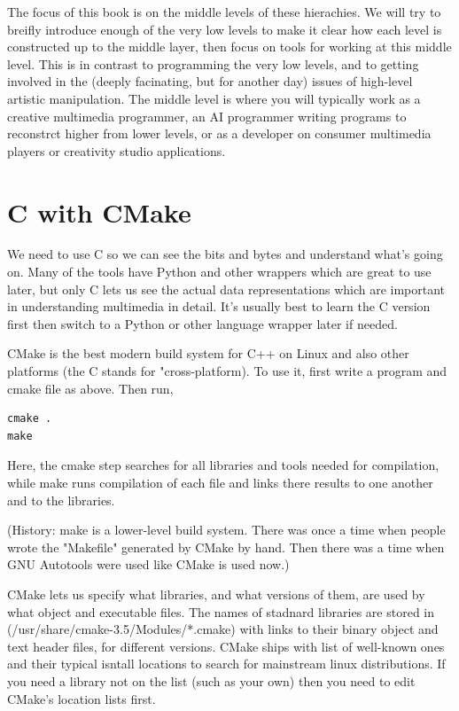 \documentclass[oneside,english]{scrbook}
\begin{document}
The focus of this book is on the middle levels of these hierachies. We will try to breifly introduce enough of the very low levels to make it clear how each level is constructed up to the middle layer, then focus on tools for working at this middle level.   This is in contrast to programming the very low levels, and to getting involved in the (deeply facinating, but for another day) issues of high-level artistic manipulation.   The middle level is where you will typically work as a creative multimedia programmer, an AI programmer writing programs to reconstrct higher from lower levels, or as a developer on consumer multimedia players or creativity studio applications.

\section{C with CMake}

We need to use C so we can see the bits and bytes and understand what's going on.  Many of the tools have Python and other wrappers which are great to use later, but only C lets us see the actual data representations which are important in understanding multimedia in detail.  It's usually best to learn the C version first then switch to a Python or other language wrapper later if needed.




CMake is the best modern build system for C++ on Linux and also other platforms (the C stands for "cross-platform).  To use it, first write a program and cmake file as above. Then run,
\begin{lstlisting}
cmake .
make
\end{lstlisting}

Here, the cmake step searches for all libraries and tools needed for compilation, while make runs compilation of each file and links there results to one another and to the libraries.

(History: make is a lower-level build system. There was once a time when people wrote the "Makefile" generated by CMake by hand.  Then there was a time when GNU Autotools were used like CMake is used now.)

CMake lets us specify what libraries, and what versions of them,  are used by what object and executable files.  The names of stadnard libraries are stored in (/usr/share/cmake-3.5/Modules/*.cmake) with links to their binary object and text header files, for different versions.  CMake ships with list of well-known ones and their typical isntall locations to search for mainstream linux distributions. If you need a library not on the list (such as your own) then you need to edit CMake's location lists first.
\end{document}
